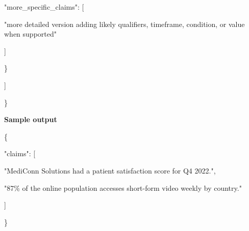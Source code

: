 \begin{tcolorbox}
\begin{scriptsize}
      "more\_specific\_claims": [\par
        "more detailed version adding likely qualifiers, timeframe, condition, or value when supported"\par
      ]\par
    \}\par
  ]\par
\}\par
\medskip
\normalfont\textbf{Sample output}\par
\ttfamily
\{\par
  "claims": [\par
    "MediConn Solutions had a patient satisfaction score for Q4 2022.",\par
    "87\% of the online population accesses short-form video weekly by country."\par
  ]\par
\}\par
\end{scriptsize}
\end{tcolorbox}

